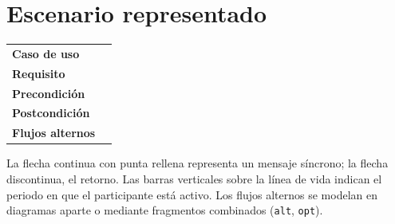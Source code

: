 \documentclass[11pt,a4paper]{article}
\begin{document}
\section*{Escenario representado}

\begin{center}
\begin{tabularx}{\linewidth}{@{}L{3.6cm} Y@{}}
\toprule
\sffamily\bfseries\small\color{lgPrimario}Caso de uso     &  \\
\sffamily\bfseries\small\color{lgPrimario}Requisito       &  \\
\sffamily\bfseries\small\color{lgPrimario}Precondición    &  \\
\sffamily\bfseries\small\color{lgPrimario}Postcondición   &  \\
\sffamily\bfseries\small\color{lgPrimario}Flujos alternos &  \\
\bottomrule
\end{tabularx}
\end{center}

\begin{nota}[Notación]
La flecha continua con punta rellena representa un mensaje síncrono; la flecha
discontinua, el retorno. Las barras verticales sobre la línea de vida indican el
periodo en que el participante está activo. Los flujos alternos se modelan en
diagramas aparte o mediante fragmentos combinados (\texttt{alt}, \texttt{opt}).
\end{nota}
\end{document}
